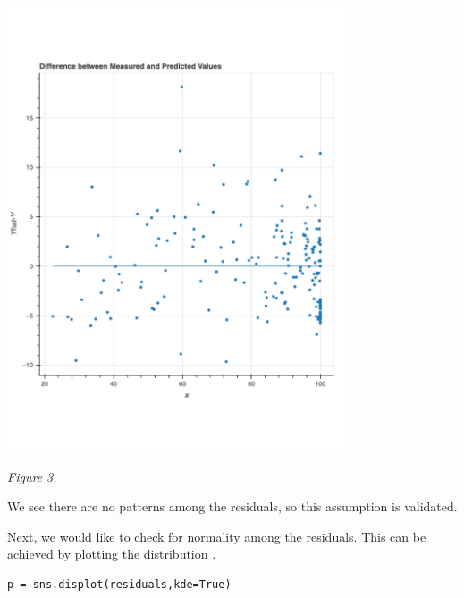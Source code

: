 \documentclass[12pt]{article}
\begin{document}
\begin{center}
\includegraphics[width=4in]{Manuscript/figure5.pdf}\\
\end{center}

\begin{center}
    \textit{Figure 3.}
\end{center}

\newpage

\noindent
We see there are no patterns among the residuals, so this assumption is validated.

\vspace{15pt}

\noindent
Next, we would like to check for normality among the residuals. This can be achieved by plotting the distribution \citep{kaggleassumptions}.

\begin{lstlisting}
p = sns.displot(residuals,kde=True)
\end{lstlisting}
\end{document}

